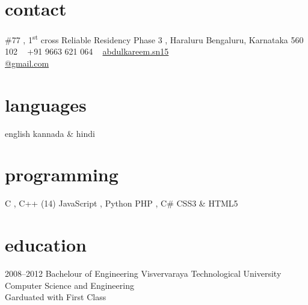 \documentclass[print]{friggeri-cv} %
\begin{document}


\begin{aside} %
\section{contact}
\#77 , 1\textsuperscript{st}  cross
Reliable Residency Phase 3 , Haraluru
Bengaluru, Karnataka 560 102
~
+91 9663 621 064
~
\href{mailto:abdulkareem.sn15@gmail.com}{abdulkareem.sn15\\@gmail.com}
\section{languages}
english 
kannada \& hindi
\section{programming}
C , C++ (14)
JavaScript , Python
PHP , C\#
CSS3 \& HTML5
\end{aside}


\section{education}

\begin{entrylist}


\entry
{2008--2012}
{Bachelour {\normalfont of Engineering}}
{Visvervaraya Technological University}
{Computer Science and Engineering\\Garduated with First Class}






\end{entrylist}
\end{document}
